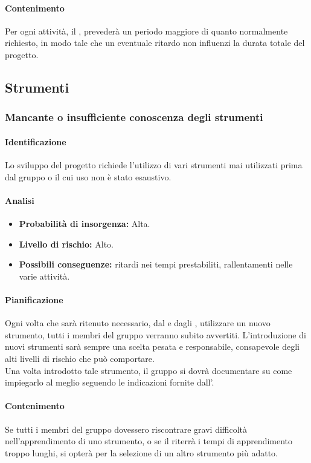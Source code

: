 \paragraph {Contenimento}
Per ogni attività, il \RdP{}, prevederà un periodo maggiore di quanto normalmente richiesto, in modo tale che un eventuale ritardo non influenzi la durata totale del progetto.

\subsection{Strumenti}
\subsubsection{Mancante o insufficiente conoscenza degli strumenti}
\paragraph {Identificazione}
Lo sviluppo del progetto richiede l'utilizzo di vari strumenti mai utilizzati prima dal gruppo o il cui uso non è stato esaustivo.

\paragraph{Analisi}
\begin{itemize}
	\item \textbf{Probabilità di insorgenza:} Alta.
	\item \textbf{Livello di rischio:} Alto.
	\item \textbf{Possibili conseguenze:} ritardi nei tempi prestabiliti, rallentamenti nelle varie attività.
\end{itemize}

\paragraph {Pianificazione}

Ogni volta che sarà ritenuto necessario, dal \RdP{} e dagli \adms{}, utilizzare un nuovo strumento, tutti i membri del gruppo verranno subito avvertiti. L'introduzione di nuovi strumenti sarà sempre una scelta pesata e responsabile, consapevole degli alti livelli di rischio che può comportare. \\
Una volta introdotto tale strumento, il gruppo si dovrà documentare su come impiegarlo al meglio seguendo le indicazioni fornite dall’\adm{}.

\paragraph {Contenimento}
Se tutti i membri del gruppo dovessero riscontrare gravi difficoltà nell'apprendimento di uno strumento, o se il \RdP{} riterrà i tempi di apprendimento troppo lunghi, si opterà per la selezione di un altro strumento più adatto.

